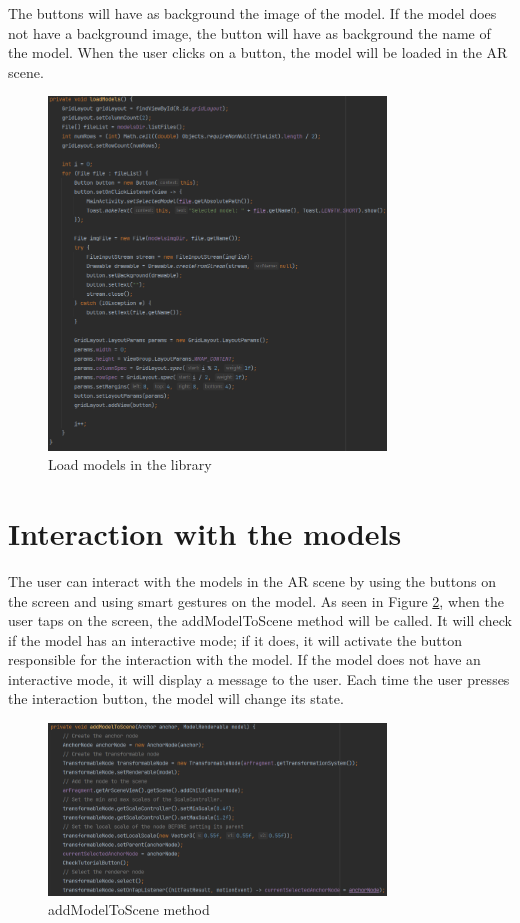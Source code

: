 The buttons will have as background the image of the model. If the model does not have a background image, the button will have as background the name of the model. When the user clicks on a button, the model will be loaded in the \ac{AR} scene.

\begin{figure}[H]
    \centering
    \includegraphics[width=0.8\textwidth]{img/code/loadModels.png}
    \caption{Load models in the library}
    \label{fig:loadModels}
\end{figure}

\newpage
\section{Interaction with  the models}
The user can interact with the models in the \ac{AR} scene by using the buttons on the screen and using smart gestures on the model. As seen in Figure \ref{fig:addModeltoScene}, when the user taps on the screen, the addModelToScene method will be called. It will check if the model has an interactive mode; if it does, it will activate the button responsible for the interaction with the model. If the model does not have an interactive mode, it will display a message to the user. Each time the user presses the interaction button, the model will change its state.

\begin{figure}[H]
    \centering
    \includegraphics[width=0.8\textwidth]{img/code/addModelToScene.png}
    \caption{addModelToScene method}
    \label{fig:addModeltoScene}
\end{figure}

